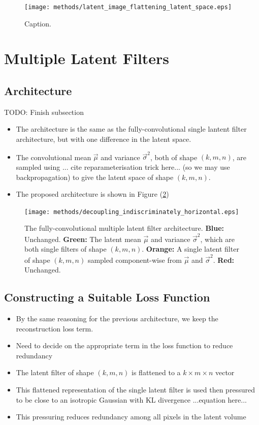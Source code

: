 \begin{figure}[H]
\centering
\captionsetup{justification=centering}
\texttt{[image: methods/latent\_image\_flattening\_latent\_space.eps]}
\caption{Caption.}
\label{fig:latent_image_flattening_latent_space}
\end{figure}


%
%
%
%
%
\section{Multiple Latent Filters}
\lipsum[2]

%
%
\subsection{Architecture}
TODO: Finish subsection

\begin{itemize}
\item The architecture is the same as the fully-convolutional single lantent filter architecture, but with one difference in the latent space.
\item The convolutional mean $\vec{\mu}$ and variance $\vec{\sigma}^2$, both of shape $(k, m, n)$, are sampled using ... cite reparameterisation trick here... (so we may use backpropagation) to give the latent space of shape $(k, m, n)$. 
\item The proposed architecture is shown in Figure (\ref{fig:decoupling_indiscriminately_horizontal})
\end{itemize}

\begin{figure}[h!]
\centering
\captionsetup{justification=centering}
\texttt{[image: methods/decoupling\_indiscriminately\_horizontal.eps]}
\caption{The fully-convolutional multiple latent filter architecture. \textbf{Blue:} Unchanged. \textbf{Green:} The latent mean $\vec{\mu}$ and variance $\vec{\sigma}^2$, which are both single filters of shape $(k, m, n)$. \textbf{Orange:} A single latent filter of shape $(k, m, n)$ sampled component-wise from $\vec{\mu}$ and $\vec{\sigma}^2$. \textbf{Red:} Unchanged.}
\label{fig:decoupling_indiscriminately_horizontal}
\end{figure}


%
%
\subsection{Constructing a Suitable Loss Function}
\begin{itemize}
\item By the same reasoning for the previous architecture, we keep the reconstruction loss term. 
\item Need to decide on the appropriate term in the loss function to reduce redundancy
\item The latent filter of shape $(k, m, n)$ is flattened to a $k \times m \times n$ vector
\item This flattened representation of the single latent filter is used then pressured to be close to an isotropic Gaussian with KL divergence ...equation here...
\item This pressuring reduces redundancy among all pixels in the latent volume
\end{itemize}

